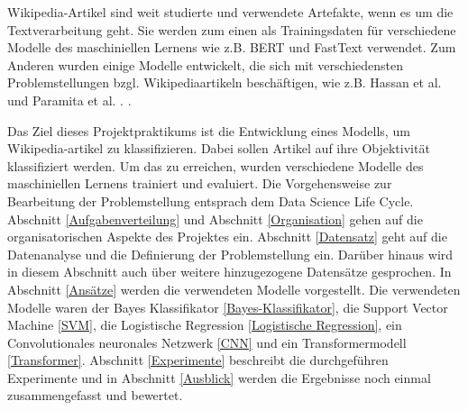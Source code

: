 Wikipedia-Artikel sind weit studierte und verwendete Artefakte, wenn es um die Textverarbeitung geht. Sie werden zum einen als Trainingsdaten für verschiedene Modelle des maschiniellen Lernens wie z.B. BERT \cite{BERTReference} und FastText \cite{DBLP:journals/corr/BojanowskiGJM16} verwendet. Zum Anderen wurden einige Modelle entwickelt, die sich mit verschiedensten Problemstellungen bzgl. Wikipediaartikeln beschäftigen, wie z.B. Hassan et al. \cite{shavarani2020multiclassmultilingualclassificationwikipedia} und Paramita et al. \cite{das2024languageagnosticmodelingwikipediaarticles}. .


Das Ziel dieses Projektpraktikums ist die Entwicklung eines Modells, um Wikipedia-artikel zu klassifizieren. Dabei sollen Artikel auf ihre Objektivität klassifiziert werden. Um das zu erreichen, wurden verschiedene Modelle des maschiniellen Lernens trainiert und evaluiert. Die Vorgehensweise zur Bearbeitung der Problemstellung entsprach dem Data Science Life Cycle. Abschnitt \ref{Aufgabenverteilung} und Abschnitt \ref{Organisation} gehen auf die organisatorischen Aspekte des Projektes ein. Abschnitt \ref{Datensatz} geht auf die Datenanalyse und die Definierung der Problemstellung ein. Darüber hinaus wird in diesem Abschnitt auch über weitere hinzugezogene Datensätze gesprochen. In Abschnitt \ref{Ansätze} werden die verwendeten Modelle vorgestellt. Die verwendeten Modelle waren der Bayes Klassifikator \ref{Bayes-Klassifikator}, die Support Vector Machine \ref{SVM}, die Logistische Regression \ref{Logistische Regression}, ein Convolutionales neuronales Netzwerk \ref{CNN} und ein Transformermodell \ref{Transformer}. Abschnitt \ref{Experimente} beschreibt die durchgeführen Experimente und in Abschnitt \ref{Ausblick} werden die Ergebnisse noch einmal zusammengefasst und bewertet.

